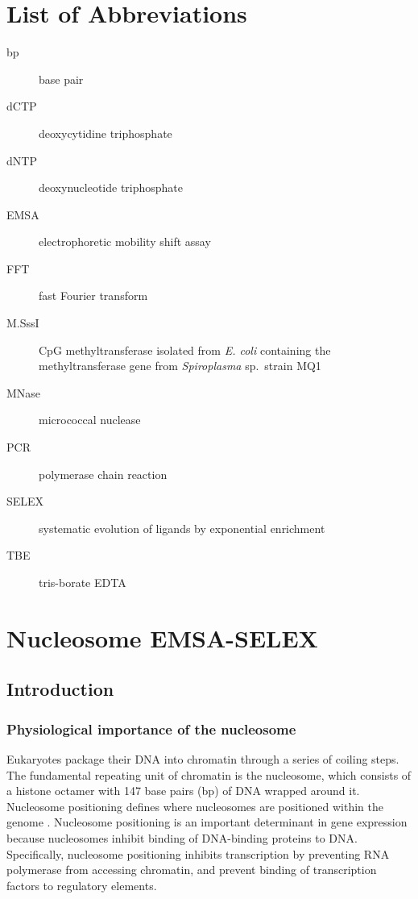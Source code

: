 \documentclass[parskip=full, numbers=noenddot]{scrbook}
\begin{document}
\tableofcontents

\chapter*{List of Abbreviations}
\label{ch:abbrev}

\begin{description}
\item [bp] base pair
\item [dCTP] deoxycytidine triphosphate
\item [dNTP] deoxynucleotide triphosphate
\item [EMSA] electrophoretic mobility shift assay
\item [FFT] fast Fourier transform
\item [M.SssI] CpG methyltransferase isolated from \emph{E. coli} containing the methyltransferase gene from \emph{Spiroplasma} sp.\ strain MQ1
\item [MNase] micrococcal nuclease
\item [PCR] polymerase chain reaction
\item [SELEX] systematic evolution of ligands by exponential enrichment
\item [TBE] tris-borate EDTA
\end{description}

\mainmatter

\chapter{Nucleosome EMSA-SELEX}
\label{ch:emsaselex}

\section{Introduction}
\label{sec:emsaselex_intro}

\subsection{Physiological importance of the nucleosome}
\label{ssec:emsaselex_intro_importance}

Eukaryotes package their DNA into chromatin through a series of coiling steps.  The fundamental repeating unit of chromatin is the nucleosome, which consists of a histone octamer with 147 base pairs (bp) of DNA wrapped around it.  Nucleosome positioning defines where nucleosomes are positioned within the genome \citep{struhl_determinants_2013}.  Nucleosome positioning is an important determinant in gene expression because nucleosomes inhibit binding of DNA-binding proteins to DNA.  Specifically, nucleosome positioning inhibits transcription by preventing RNA polymerase from accessing chromatin, and prevent binding of transcription factors to regulatory elements.
\end{document}
